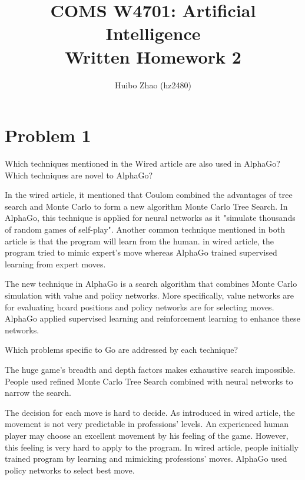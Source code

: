 \documentclass[11pt]{article}
\begin{document}
 
 
\title{COMS W4701: Artificial Intelligence\\
       Written Homework 2}
\author{Huibo Zhao (hz2480)} %
\maketitle

\section*{Problem 1} 
 

Which techniques mentioned in the Wired article are also used in AlphaGo? Which techniques are novel to AlphaGo? \newline

In the wired article, it mentioned that Coulom combined the advantages of tree search and Monte Carlo to form a new algorithm Monte Carlo Tree Search. In AlphaGo, this technique is applied for neural networks as it "simulate thousands of random games of self-play". Another common technique mentioned in both article is that the program will learn from the human. in wired article, the program tried to mimic expert's move whereas AlphaGo trained supervised learning from expert moves.\newline

The new technique in AlphaGo is a search algorithm that combines Monte Carlo simulation with value and policy networks. More specifically, value networks are for evaluating board positions and policy networks are for selecting moves. AlphaGo applied supervised learning and reinforcement learning to enhance these networks. \newline
\newline

\noindent
Which problems specific to Go are addressed by each technique? \newline

The huge game's breadth and depth factors makes exhaustive search impossible. People used refined Monte Carlo Tree Search combined with neural networks to narrow the search. \newline

The decision for each move is hard to decide. As introduced in wired article, the movement is not very predictable in professions' levels. An experienced human player may choose an excellent movement by his feeling of the game. However, this feeling is very hard to apply to the program. In wired article, people initially trained program by learning and mimicking professions' moves. AlphaGo used policy networks to select best move. \newline
\end{document}
